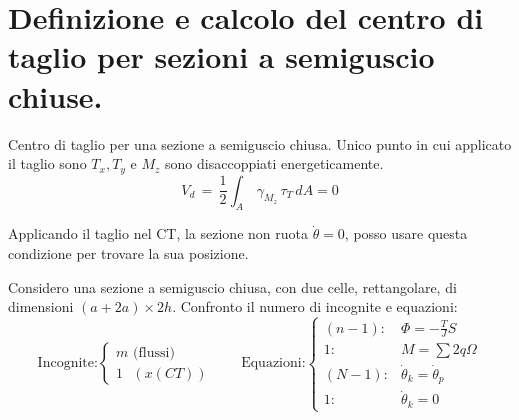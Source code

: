\section{Definizione e calcolo del centro di taglio per sezioni a semiguscio chiuse.}


\begin{definizioneBox}
    Centro di taglio per una sezione a semiguscio chiusa. Unico punto in cui applicato il taglio sono $T_x,T_y$ e $M_z$ sono disaccoppiati energeticamente.
    \begin{equation*}
    V_d\,=\,\frac{1}{2}\int_A \, \gamma_{M_z}\,\tau_T\,dA=0
\end{equation*}

Applicando il taglio nel CT, la sezione non ruota $\dot{\theta}=0$, posso usare questa condizione per trovare la sua posizione.
\end{definizioneBox}

Considero una sezione a semiguscio chiusa, con due celle, rettangolare, di dimensioni $(a+2a)\times2h$. Confronto il numero di incognite e equazioni:
\begin{equation*}
    \text{Incognite:} \begin{cases}
        m \text{ (flussi)} \\
        1 \text{ }(x(CT))
    \end{cases}
    \qquad
    \text{Equazioni:} \begin{cases}
        (n-1): & \Phi = -\frac{T}{J}S \\
        1: & M = \sum 2q\Omega \\
        (N-1): & \dot{\theta}_k = \dot{\theta}_p \\
        1: & \dot{\theta}_k = 0
    \end{cases}
\end{equation*}

